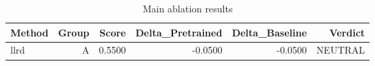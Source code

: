 \begin{table}[htbp]
\centering
\caption{Main ablation results}
\label{tab:main-results}
\begin{tabular}{lrrrrr}
\toprule
\textbf{Method} & \textbf{Group} & \textbf{Score} & \textbf{Delta\_Pretrained} & \textbf{Delta\_Baseline} & \textbf{Verdict} \\
\midrule
llrd & A & 0.5500 & -0.0500 & -0.0500 & NEUTRAL \\
\bottomrule
\end{tabular}
\end{table}